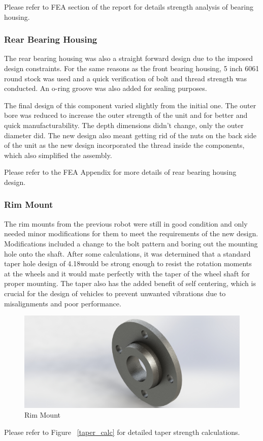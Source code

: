 Please refer to FEA section of the report for details strength analysis of bearing housing.

\subsubsection{Rear Bearing Housing}
The rear bearing housing was also a straight forward design due to the imposed design constraints. For the same reasons as the front bearing housing, 5 inch 6061 round stock was used and a quick verification of bolt and thread strength was conducted. An o-ring groove was also added for sealing purposes.

The final design of this component varied slightly from the initial one. The outer bore was reduced to increase the outer strength of the unit and for better and quick manufacturability. The depth dimensions didn't change, only the outer diameter did. The new design also meant getting rid of the nuts on the back side of the unit as the new design incorporated the thread inside the components, which also simplified the assembly.

Please refer to the FEA Appendix for more details of rear bearing housing design.

\subsubsection{Rim Mount}
The rim mounts from the previous robot were still in good condition and only needed minor modifications for them to meet the requirements of the new design. Modifications included a change to the bolt pattern and boring out the mounting hole onto the shaft. After some calculations, it was determined that a standard taper hole design of 4.18\degree would be strong enough to resist the rotation moments at the wheels and it would mate perfectly with the taper of the wheel shaft for proper mounting. The taper also has the added benefit of self centering, which is crucial for the design of vehicles to prevent unwanted vibrations due to misalignments and poor performance.

\begin{figure}[h]\centering
	\includegraphics[width=.7\linewidth]{dom/rim_mount_iso_rndr.jpg}
	\caption{Rim Mount}
	\label{fig:rim_mount}
\end{figure}
 

Please refer to Figure ~\ref{taper_calc} for detailed taper strength calculations.
